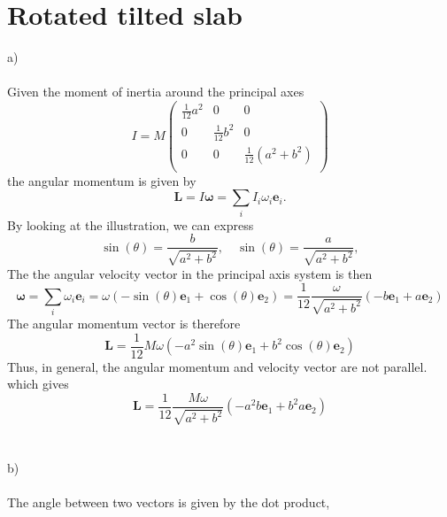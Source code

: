 \documentclass{article}
\begin{document}
    \section{Rotated tilted slab}
    a) \\ \\  
    Given the moment of inertia around the principal axes
    \begin{equation*}
        I = M
        \begin{pmatrix}
            \frac{1}{12} a^2& 0 & 0 \\
            0 & \frac{1}{12} b^2 & 0 \\
            0 & 0 & \frac{1}{12} (a^2 + b^2)\\
        \end{pmatrix}
    \end{equation*}
    the angular momentum is given by
    \begin{equation*}
        \mathbf{L} = I \mathbf{\omega} = \sum_i  I_i \omega_i  \mathbf{e}_i.
    \end{equation*}
    By looking at the illustration, we can express
    \begin{equation*}
        \sin(\theta) = \frac{b}{\sqrt{a^2 + b^2}}, \quad \sin(\theta) = \frac{a}{\sqrt{a^2 + b^2}},
    \end{equation*}
    The the angular velocity vector in the principal axis system is then
    \begin{equation*}
        \boldsymbol{\omega} = \sum_i \omega_i \mathbf{e}_i = \omega (-\sin(\theta) \mathbf{e}_1 + \cos(\theta) \mathbf{e}_2) = \frac{1}{12}\frac{\omega}{\sqrt{a^2 + b^2}}(-b \mathbf{e}_1 + a \mathbf{e}_2)
    \end{equation*} 
    The angular momentum vector is therefore
    \begin{equation*}
        \mathbf{L} = \frac{1}{12} M \omega(-a^2\sin(\theta) \mathbf{e}_1 + b^2\cos(\theta) \mathbf{e}_2)
    \end{equation*}
    Thus, in general, the angular momentum and velocity vector are not parallel. 
    which gives
    \begin{equation*}
        \mathbf{L} = \frac{1}{12}\frac{M \omega}{\sqrt{a^2 + b^2}}(-a^2b \mathbf{e}_1 + b^2a \mathbf{e}_2)
    \end{equation*} 
    \\ \\
    b) \\ \\
    The angle between two vectors is given by the dot product,
\end{document}
